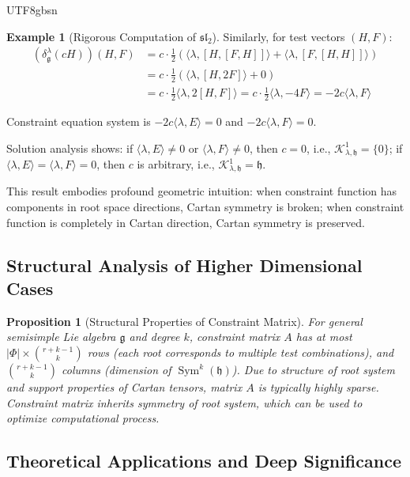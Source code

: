 \documentclass[a4paper,12pt]{extarticle}
\newtheorem{proposition}[theorem]{Proposition}
\theoremstyle{definition}
\newtheorem{example}{Example}[section]
\begin{document}
\begin{CJK}{UTF8}{gbsn}
\begin{example}[Rigorous Computation of $\mathfrak{sl}_2$]
Similarly, for test vectors $(H, F)$:
\begin{align}
(\delta^\lambda_\mathfrak{g}(cH))(H, F) &= c \cdot \frac{1}{2} \left( \langle \lambda, [H, [F, H]] \rangle + \langle \lambda, [F, [H, H]] \rangle \right) \\
&= c \cdot \frac{1}{2} \left( \langle \lambda, [H, 2F] \rangle + 0 \right) \\
&= c \cdot \frac{1}{2} \langle \lambda, 2[H, F] \rangle = c \cdot \frac{1}{2} \langle \lambda, -4F \rangle = -2c \langle \lambda, F \rangle
\end{align}

Constraint equation system is $-2c \langle \lambda, E \rangle = 0$ and $-2c \langle \lambda, F \rangle = 0$.

Solution analysis shows: if $\langle \lambda, E \rangle \neq 0$ or $\langle \lambda, F \rangle \neq 0$, then $c = 0$, i.e., $\mathcal{K}^1_{\lambda,\mathfrak{h}} = \{0\}$; if $\langle \lambda, E \rangle = \langle \lambda, F \rangle = 0$, then $c$ is arbitrary, i.e., $\mathcal{K}^1_{\lambda,\mathfrak{h}} = \mathfrak{h}$.

This result embodies profound geometric intuition: when constraint function has components in root space directions, Cartan symmetry is broken; when constraint function is completely in Cartan direction, Cartan symmetry is preserved.
\end{example}

\subsection{Structural Analysis of Higher Dimensional Cases}
\label{subsec:higher_dimensional_structure}

\begin{proposition}[Structural Properties of Constraint Matrix]
\label{prop:constraint_matrix_structure}
For general semisimple Lie algebra $\mathfrak{g}$ and degree $k$, constraint matrix $A$ has at most $|\Phi| \times \binom{r+k-1}{k}$ rows (each root corresponds to multiple test combinations), and $\binom{r+k-1}{k}$ columns (dimension of $\operatorname{Sym}^k(\mathfrak{h})$). Due to structure of root system and support properties of Cartan tensors, matrix $A$ is typically highly sparse. Constraint matrix inherits symmetry of root system, which can be used to optimize computational process.
\end{proposition}

\subsection{Theoretical Applications and Deep Significance}
\label{subsec:theoretical_applications}


\end{CJK}
\end{document}
